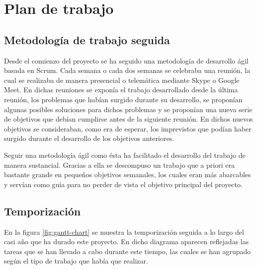 
\chapter{Plan de trabajo}


\section{Metodología de trabajo seguida}

Desde el comienzo del proyecto se ha seguido una metodología de desarrollo ágil basada en
Scrum. Cada semana o cada dos semanas se celebraba una reunión, la cual se realizaba de manera
presencial o telemática mediante Skype o Google Meet. En dichas reuniones se exponía el trabajo
desarrollado desde la última reunión, los problemas que habían surgido durante su desarrollo, se
proponían algunas posibles soluciones para dichos problemas y se proponían una nueva serie de
objetivos que debían cumplirse antes de la siguiente reunión. En dichos nuevos objetivos se
consideraban, como era de esperar, los imprevistos que podían haber surgido durante el desarrollo
de los objetivos anteriores.

Seguir una metodología ágil como ésta ha facilitado el desarrollo del trabajo de manera sustancial.
Gracias a ella se descompuso un trabajo que a priori era bastante grande en pequeños objetivos semanales,
los cuales eran más abarcables y servían como guía para no perder de vista el objetivo principal del proyecto.

\section{Temporización}

En la figura \ref{fig:gantt-chart} se muestra la temporización seguida a lo largo del casi año que ha
durado este proyecto. En dicho diagrama aparecen reflejadas las tareas que se han llevado a cabo durante
este tiempo, las cuales se han agrupado según el tipo de trabajo que había que realizar.

